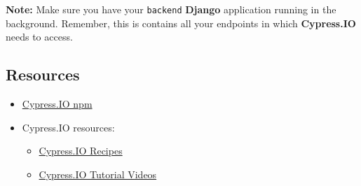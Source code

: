 \documentclass{article}
\begin{document}
\textbf{Note:} Make sure you have your \texttt{backend} \textbf{Django} application running in the background. Remember, this is contains all your endpoints in which \textbf{Cypress.IO} needs to access.

\subsection*{Resources} 
\begin{itemize}
  \item \href{https://www.npmjs.com/package/cypress}{Cypress.IO npm}
  \item Cypress.IO resources:
  \begin{itemize}
    \item \href{https://docs.cypress.io/examples/examples/recipes.html#Fundamentals}{Cypress.IO Recipes}
    \item \href{https://docs.cypress.io/examples/examples/recipes.html#Fundamentals}{Cypress.IO Tutorial Videos}
  \end{itemize}
\end{itemize}
 
\end{document}
